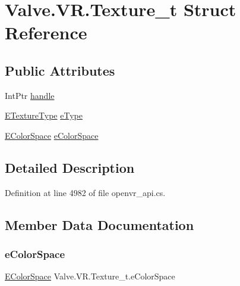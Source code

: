 \hypertarget{struct_valve_1_1_v_r_1_1_texture__t}{}\section{Valve.\+V\+R.\+Texture\+\_\+t Struct Reference}
\label{struct_valve_1_1_v_r_1_1_texture__t}
\subsection*{Public Attributes}
\begin{DoxyCompactItemize}
\item 
Int\+Ptr \mbox{\hyperlink{struct_valve_1_1_v_r_1_1_texture__t_a8b544ad2cfd49e3b272886c684e405cf}{handle}}
\item 
\mbox{\hyperlink{namespace_valve_1_1_v_r_a9481de640e411eef49c2f3fdca82eaa3}{E\+Texture\+Type}} \mbox{\hyperlink{struct_valve_1_1_v_r_1_1_texture__t_ad7b4a7326e0b7ffe2d129c3fbfa66dd3}{e\+Type}}
\item 
\mbox{\hyperlink{namespace_valve_1_1_v_r_aeb0fba37ba28d8ca276d7c10f01809ac}{E\+Color\+Space}} \mbox{\hyperlink{struct_valve_1_1_v_r_1_1_texture__t_aa89e827952b84c1081b781c40e35e0f3}{e\+Color\+Space}}
\end{DoxyCompactItemize}


\subsection{Detailed Description}


Definition at line 4982 of file openvr\+\_\+api.\+cs.



\subsection{Member Data Documentation}
\mbox{\label{struct_valve_1_1_v_r_1_1_texture__t_aa89e827952b84c1081b781c40e35e0f3}} 
\subsubsection{\texorpdfstring{eColorSpace}{eColorSpace}}
{\footnotesize\ttfamily \mbox{\hyperlink{namespace_valve_1_1_v_r_aeb0fba37ba28d8ca276d7c10f01809ac}{E\+Color\+Space}} Valve.\+V\+R.\+Texture\+\_\+t.\+e\+Color\+Space}



